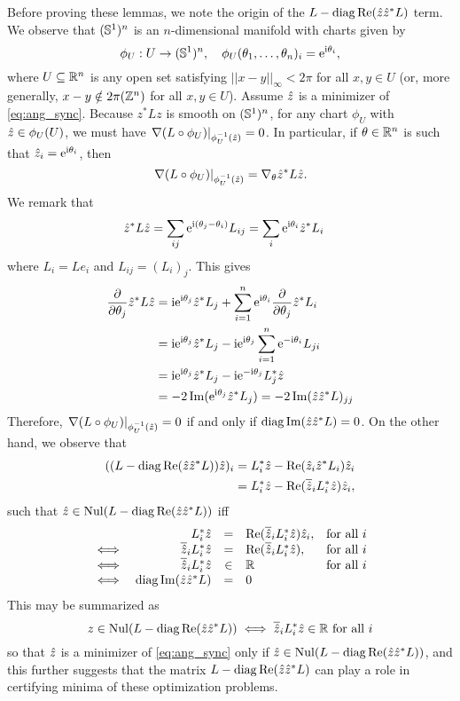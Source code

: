 Before proving these lemmas, we note the origin of the $L - \operatorname{diag} \operatorname{Re} (\hat{z} \hat{z}^* L)$ term.  We observe that $(\mathbb{S}^1)^n$ is an $n$-dimensional manifold with charts given by \[\phi_U : U \to (\mathbb{S}^1)^n,\quad \phi_U(\theta_1, \ldots, \theta_n)_i = \mathrm{e}^{\mathrm{i} \theta_i},\] where $U \subseteq \mathbb{R}^n$ is any open set satisfying $||x - y||_\infty < 2 \pi$ for all $x, y \in U$ (or, more generally, $x - y \notin 2 \pi (\mathbb{Z}^n)$ for all $x, y \in U$).  Assume $\hat{z}$ is a minimizer of \eqref{eq:ang_sync}.  Because $z^* L z$ is smooth on $(\mathbb{S}^1)^n$, for any chart $\phi_U$ with $\hat{z} \in \phi_U(U)$, we must have $\left.\nabla (L \circ \phi_U)\right|_{\phi_U^{-1}(\hat{z})} = 0$.  In particular, if $\theta \in \mathbb{R}^n$ is such that $\hat{z}_i = \mathrm{e}^{\mathrm{i} \theta_i}$, then \[\left.\nabla (L \circ \phi_U)\right|_{\phi_U^{-1}(\hat{z})} = \nabla_\theta \hat{z}^* L \hat{z}.\]  We remark that \begin{align*} \hat{z}^* L \hat{z} &= \sum_{ij} \mathrm{e}^{\mathrm{i} (\theta_j - \theta_i)} L_{ij} = \sum_i \mathrm{e}^{\mathrm{i} \theta_i} \hat{z}^* L_i \end{align*} where $L_i = L e_i$ and $L_{ij} = (L_i)_j$.  This gives \begin{align*} \frac{\partial}{\partial \theta_j} \hat{z}^* L \hat{z} &= \mathrm{i} \mathrm{e}^{\mathrm{i} \theta_j} \hat{z}^* L_j + \sum_{i = 1}^n \mathrm{e}^{\mathrm{i} \theta_i} \frac{\partial}{\partial \theta_j} \hat{z}^* L_i \\ &= \mathrm{i} \mathrm{e}^{\mathrm{i} \theta_j} \hat{z}^* L_j - \mathrm{i} \mathrm{e}^{\mathrm{i} \theta_j} \sum_{i = 1}^n \mathrm{e}^{-\mathrm{i} \theta_i} L_{ji} \\ &= \mathrm{i} \mathrm{e}^{\mathrm{i} \theta_j} \hat{z}^* L_j - \mathrm{i}\mathrm{e}^{-\mathrm{i} \theta_j} L_j^* \hat{z} \\ &= -2 \operatorname{Im}(\mathrm{e}^{\mathrm{i} \theta_j} \hat{z}^* L_j) = -2 \operatorname{Im} (\hat{z} \hat{z}^* L)_{jj}\end{align*}  Therefore, $\left.\nabla (L \circ \phi_U)\right|_{\phi_U^{-1}(\hat{z})} = 0$ if and only if $\operatorname{diag} \operatorname{Im}(\hat{z} \hat{z}^* L) = 0$.  On the other hand, we observe that \begin{align*} ((L - \operatorname{diag} \operatorname{Re}(\hat{z} \hat{z}^* L)) \hat{z})_i &= L_i^* \hat{z} - \operatorname{Re}(\hat{z}_i \hat{z}^* L_i) \hat{z}_i \\ &= L_i^* \hat{z} - \operatorname{Re}(\overline{\hat{z}}_i L_i^* \hat{z}) \hat{z}_i,\end{align*} such that $\hat{z} \in \operatorname{Nul}(L - \operatorname{diag} \operatorname{Re}(\hat{z} \hat{z}^* L))$ iff
\[
\begin{array}{crcll}
  & L_i^* \hat{z} & = & \operatorname{Re}(\overline{\hat{z}}_i L_i^* \hat{z}) \hat{z}_i, & \text{for all}\ i \\
  \iff & \overline{\hat{z}}_i L_i^* \hat{z} & = & \operatorname{Re}(\overline{\hat{z}}_i L_i^* \hat{z}), & \text{for all}\ i \\
  \iff & \overline{\hat{z}}_i L_i^* \hat{z} & \in & \mathbb{R} & \text{for all}\ i \\
  \iff & \operatorname{diag} \operatorname{Im}(\hat{z} \hat{z}^* L) & = & 0
\end{array}
\]
This may be summarized as \begin{equation} z \in \operatorname{Nul}(L - \operatorname{diag} \operatorname{Re}(\hat{z} \hat{z}^* L)) \iff \overline{\hat{z}}_i L_i^* \hat{z} \in \mathbb{R} \ \text{for all}\ i \label{eq:null_iff_real} \end{equation} so that $\hat{z}$ is a minimizer of \eqref{eq:ang_sync} only if $\hat{z} \in \operatorname{Nul}(L - \operatorname{diag}\operatorname{Re}(\hat{z}\hat{z}^* L))$, and this further suggests that the matrix $L - \operatorname{diag}\operatorname{Re}(\hat{z}\hat{z}^* L)$ can play a role in certifying minima of these optimization problems.

